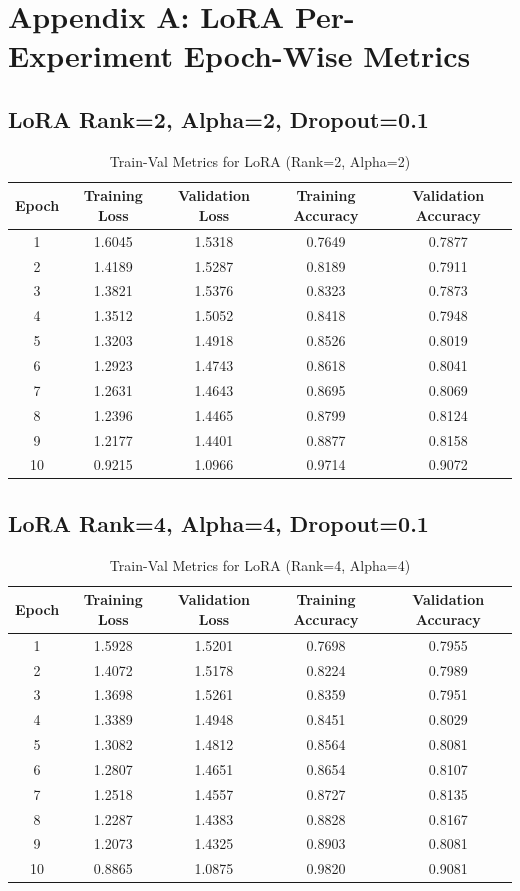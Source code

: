 \documentclass[11pt,a4paper]{article}
\begin{document}
\section*{Appendix A: LoRA Per-Experiment Epoch-Wise Metrics}

\subsection*{LoRA Rank=2, Alpha=2, Dropout=0.1}
\begin{table}[H]
\centering
\caption{Train-Val Metrics for LoRA (Rank=2, Alpha=2)}
\begin{tabular}{c c c c c}
\toprule
Epoch & Training Loss & Validation Loss & Training Accuracy & Validation Accuracy \\
\midrule
1 & 1.6045 & 1.5318 & 0.7649 & 0.7877 \\
2 & 1.4189 & 1.5287 & 0.8189 & 0.7911 \\
3 & 1.3821 & 1.5376 & 0.8323 & 0.7873 \\
4 & 1.3512 & 1.5052 & 0.8418 & 0.7948 \\
5 & 1.3203 & 1.4918 & 0.8526 & 0.8019 \\
6 & 1.2923 & 1.4743 & 0.8618 & 0.8041 \\
7 & 1.2631 & 1.4643 & 0.8695 & 0.8069 \\
8 & 1.2396 & 1.4465 & 0.8799 & 0.8124 \\
9 & 1.2177 & 1.4401 & 0.8877 & 0.8158 \\
10 & 0.9215 & 1.0966 & 0.9714 & 0.9072 \\
\bottomrule
\end{tabular}
\end{table}

\subsection*{LoRA Rank=4, Alpha=4, Dropout=0.1}
\begin{table}[H]
\centering
\caption{Train-Val Metrics for LoRA (Rank=4, Alpha=4)}
\begin{tabular}{c c c c c}
\toprule
Epoch & Training Loss & Validation Loss & Training Accuracy & Validation Accuracy \\
\midrule
1 & 1.5928 & 1.5201 & 0.7698 & 0.7955 \\
2 & 1.4072 & 1.5178 & 0.8224 & 0.7989 \\
3 & 1.3698 & 1.5261 & 0.8359 & 0.7951 \\
4 & 1.3389 & 1.4948 & 0.8451 & 0.8029 \\
5 & 1.3082 & 1.4812 & 0.8564 & 0.8081 \\
6 & 1.2807 & 1.4651 & 0.8654 & 0.8107 \\
7 & 1.2518 & 1.4557 & 0.8727 & 0.8135 \\
8 & 1.2287 & 1.4383 & 0.8828 & 0.8167 \\
9 & 1.2073 & 1.4325 & 0.8903 & 0.8081 \\
10 & 0.8865 & 1.0875 & 0.9820 & 0.9081 \\
\bottomrule
\end{tabular}
\end{table}
\end{document}
